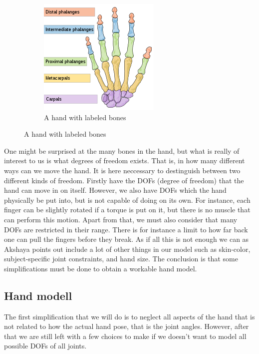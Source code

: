 \documentclass[a4paper,11pt]{kth-mag}
\begin{document}
\begin{figure}[!ht]
\begin{subfigure}[t]{0.55\textwidth}
        \includegraphics[width=\textwidth]{images/labeledhand.png}
        \caption{A hand with labeled bones}
        \label{fig:hand}
    \end{subfigure}
\end{figure}

One might be surprised at the many bones in the hand, but what is really  of interest to us is what degrees of freedom exists.
That is, in how many different ways can we move the hand.
It is here neccessary to destinguish between two different kinds of freedom.
Firstly have the DOFs (degree of freedom) that the hand can move in on itself.
However, we also have DOFs which the hand physically be put into, but is not capable of doing on its own.
For instance, each finger can be slightly rotated if a torque is put on it, but there is no muscle that can perform this motion.
Apart from that, we must also consider that many DOFs are restricted in their range.
There is for instance a limit to how far back one can pull the fingers before they break.
As if all this is not enough we can as Akshaya points out include a lot of other things in our model such as skin-color, subject-specific joint constraints, and hand size.
The conclusion is that some simplifications must be done to obtain a workable hand model.

\subsection{Hand modell}
The first simplification that we will do is to neglect all aspects of the hand that is not related to how the actual hand pose, that is the joint angles.
However, after that we are still left with a few choices to make if we doesn't want to model all possible DOFs of all joints.
\end{document}
